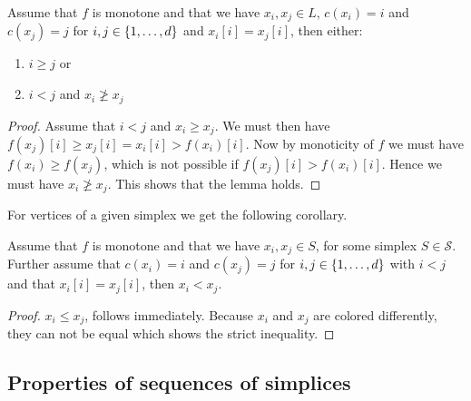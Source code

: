 \begin{lemma}
    Assume that $f$ is monotone and that we have $x_i, x_j \in L$, $c(x_i) = i$ and $c(x_j) = j$ for $i, j \in \left\{1, \dots, d\right\}$ and $x_i[i] = x_j[i]$, then either:
    \begin{enumerate}
        \item $i \geq j$ or
        \item $i < j$  and $x_i \not\geq x_j$
    \end{enumerate}
\end{lemma}
\begin{proof}
    Assume that $i < j$ and $x_i \geq x_j$. We must then have $f(x_j)[i] \geq x_j[i] = x_i[i] > f(x_i)[i]$. Now by monoticity of $f$ we must have $f(x_i) \geq f(x_j)$, which is not possible if $f(x_j)[i] > f(x_i)[i]$. Hence we must have $x_i \not\geq x_j$. This shows that the lemma holds.
\end{proof}

For vertices of a given simplex we get the following corollary.
\begin{corollary}
    Assume that $f$ is monotone and that we have $x_i, x_j \in S$, for some simplex $S\in  \mathcal{S}$. Further assume that $c(x_i) = i$ and $c(x_j) = j$ for $i, j \in \left\{1, \dots, d\right\}$ with $i < j$ and that $x_i[i] = x_j[i]$, then $x_i < x_j$.
\end{corollary}
\begin{proof}
    $x_i \leq x_j$, follows immediately. Because $x_i$ and $x_j$ are colored differently, they can not be equal which shows the strict inequality.
\end{proof}
\subsection{Properties of sequences of simplices}

